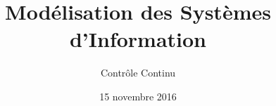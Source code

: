 \title{
   Modélisation des Systèmes d'Information
}
\author{
	Contrôle Continu
}
\date{15 novembre 2016}
